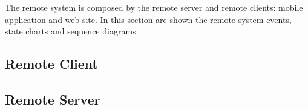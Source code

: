 
The remote system is composed by the remote server and remote clients: mobile application and web site. In this section are shown the remote system events, state charts and sequence diagrams.

\subsection{Remote Client}



\clearpage
\subsection{Remote Server}

